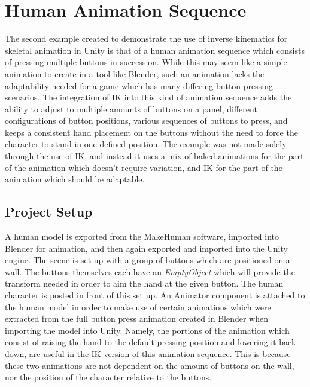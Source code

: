 \section{Human Animation Sequence}
The second example created to demonstrate the use of inverse kinematics for
skeletal animation in Unity is that of a human animation sequence which consists
of pressing multiple buttons in succession. While this may seem like a simple
animation to create in a tool like Blender, such an animation lacks the
adaptability needed for a game which has many differing button pressing
scenarios. The integration of IK into this kind of animation sequence adds the
ability to adjust to multiple amounts of buttons on a panel, different
configurations of button positions, various sequences of buttons to press, and
keeps a consistent hand placement on the buttons without the need to force the
character to stand in one defined position. The example was not made solely
through the use of IK, and instead it uses a mix of baked animations for the
part of the animation which doesn't require variation, and IK for the part of
the animation which should be adaptable.

\subsection{Project Setup}
A human model is exported from the MakeHuman software, imported into Blender for
animation, and then again exported and imported into the Unity engine. The scene
is set up with a group of buttons which are positioned on a wall. The buttons
themselves each have an \textit{EmptyObject} which will provide the transform
needed in order to aim the hand at the given button. The human character is
posted in front of this set up. An Animator component is attached to the human
model in order to make use of certain animations which were extracted from the
full button press animation created in Blender when importing the model into
Unity. Namely, the portions of the animation which consist of raising the hand
to the default pressing position and lowering it back down, are useful in the IK
version of this animation sequence. This is because these two animations are not
dependent on the amount of buttons on the wall, nor the position of the
character relative to the buttons.
